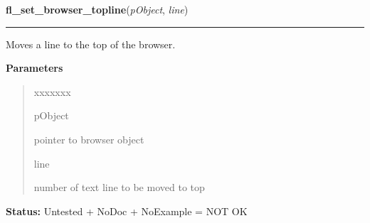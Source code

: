 \hspace{.8\funcindent}\begin{boxedminipage}{\funcwidth}

    \raggedright \textbf{fl\_set\_browser\_topline}(\textit{pObject}, \textit{line})

    \vspace{-1.5ex}

    \rule{\textwidth}{0.5\fboxrule}
\setlength{\parskip}{2ex}
    Moves a line to the top of the browser.

\setlength{\parskip}{1ex}
      \textbf{Parameters}
      \vspace{-1ex}

      \begin{quote}
        \begin{Ventry}{xxxxxxx}

          \item[pObject]

          pointer to browser object

          \item[line]

          number of text line to be moved to top

        \end{Ventry}

      \end{quote}

\textbf{Status:} Untested + NoDoc + NoExample = NOT OK



    \end{boxedminipage}

    \label{xformslib:library:fl_set_browser_bottomline}

    \vspace{0.5ex}

